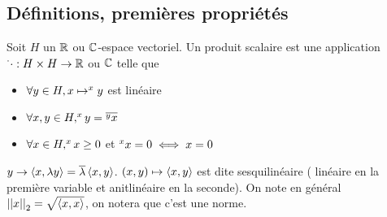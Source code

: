 \subsection{Définitions, premières propriétés}

\begin{definition}
	Soit $H$ un $\mathbb{R}$ ou $\mathbb{C}$-espace vectoriel.
	Un produit scalaire est une application $\sp{\cdot}{\cdot} : H \times H \to \mathbb{R}$ ou $\mathbb{C}$ telle que
	\begin{itemize}
		\item $\forall y \in H, x \mapsto \sp{x}{y}$ est linéaire
		\item $\forall x,y \in H, \sp{x}{y} = \overline{\sp{y}{x}}$
		\item $\forall x \in H, \sp{x}{x} \geq 0$ et $\sp{x}{x} = 0 \iff x = 0$
	\end{itemize}
\end{definition}

\begin{remarque}
	$ y \to \left\langle x, \lambda y \right\rangle = \overline{\lambda} \left\langle x, y \right\rangle $.
	$(x,y) \mapsto \left\langle x, y \right\rangle$ est dite sesquilinéaire ( linéaire en la première variable et anitlinéaire en la seconde).
	On note en général $\left|\left|x\right|\right|_2 = \sqrt{\left\langle x, x \right\rangle}$, on notera que c'est une norme.
\end{remarque}

